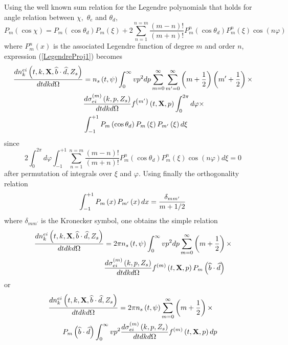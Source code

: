 Using the well known sum relation for the Legendre polynomials that holds
for angle relation between $\chi ,$ $\theta _{e}$ and $\theta _{d}$,
\begin{equation}
P_{m}\left( \cos \chi \right) =P_{m}\left( \cos \theta _{d}\right)
P_{m}\left( \xi \right) +2\sum_{n=1}^{n=m}\frac{\left( m-n\right) !}{\left(
m+n\right) !}P_{m}^{n}\left( \cos \theta _{d}\right) P_{m}^{n}\left( \xi
\right) \cos \left( n\varphi \right)
\end{equation}
where $P_{m}^{n}\left( x\right) $ is the associated Legendre function of
degree $m$ and order $n$, expression (\ref{LegendreProj1}) becomes
\begin{align}
\frac{dn_{k}^{ei}\left( t,k,\mathbf{X},\widehat{b}\cdot \widehat{d}%
,Z_{s}\right) }{dtdkd\Omega }& =n_{s}\left( t,\psi \right) \int_{0}^{\infty %
}vp^{2}dp\sum_{m=0}^{\infty }\sum_{m^{\prime }=0}^{\infty }\left( m+\frac{1}{%
2}\right) \left( m^{\prime }+\frac{1}{2}\right) \times   \nonumber \\
& \frac{d\sigma _{ei}^{\left( m\right) }\left( k,p,Z_{s}\right) }{dtdkd%
\Omega }f^{\left( m^{\prime }\right) }\left( t,\mathbf{X},p\right)
\int_{0}^{2\pi }d\varphi \times   \nonumber \\
& \int_{-1}^{+1}P_{m}\left( \cos \theta _{d}\right) P_{m}\left( \xi \right)
P_{m^{\prime }}\left( \xi \right) d\xi
\end{align}
since
\begin{equation}
2\int_{0}^{2\pi }d\varphi \int_{-1}^{+1}\sum_{n=1}^{n=m}\frac{\left(
m-n\right) !}{\left( m+n\right) !}P_{m}^{n}\left( \cos \theta _{d}\right)
P_{m}^{n}\left( \xi \right) \cos \left( n\varphi \right) d\xi =0
\end{equation}
after permutation of integrals over $\xi $ and $\varphi .$ Using finally the
orthogonality relation
\begin{equation}
\int_{-1}^{+1}P_{m}\left( x\right) P_{m^{\prime }}\left( x\right) dx=\frac{%
\delta _{mm^{\prime }}}{m+1/2}  \label{orthoLegendre}
\end{equation}
where $\delta _{mm^{\prime }}$ is the Kronecker symbol, one obtains the
simple relation
\begin{align}
\frac{dn_{k}^{ei}\left( t,k,\mathbf{X},\widehat{b}\cdot \widehat{d}%
,Z_{s}\right) }{dtdkd\Omega }& =2\pi n_{s}\left( t,\psi \right) \int_{0}^{%
\infty }vp^{2}dp\sum_{m=0}^{\infty }\left( m+\frac{1}{2}\right) \times
\nonumber \\
& \frac{d\sigma _{ei}^{\left( m\right) }\left( k,p,Z_{s}\right) }{dtdkd%
\Omega }f^{\left( m\right) }\left( t,\mathbf{X},p\right) P_{m}\left(
\widehat{b}\cdot \widehat{d}\right)
\end{align}
or
\begin{align}
& \frac{dn_{k}^{ei}\left( t,k,\mathbf{X},\widehat{b}\cdot \widehat{d}%
,Z_{s}\right) }{dtdkd\Omega }=2\pi n_{s}\left( t,\psi \right) \sum_{m=0}^{%
\infty }\left( m+\frac{1}{2}\right) \times   \nonumber \\
& \quad \quad P_{m}\left( \widehat{b}\cdot \widehat{d}\right) \int_{0}^{%
\infty }vp^{2}\frac{d\sigma _{ei}^{\left( m\right) }\left( k,p,Z_{s}\right)
}{dtdkd\Omega }f^{\left( m\right) }\left( t,\mathbf{X},p\right) dp
\end{align}

